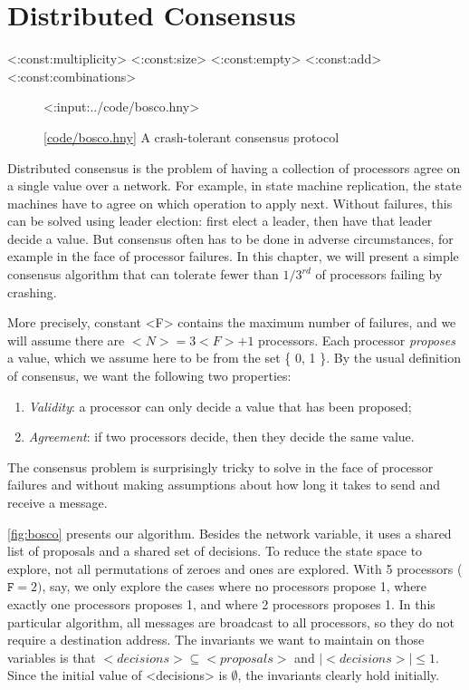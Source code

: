 \documentclass{report}
\newcommand{\harmonylink}[1]{%
[\href{https://harmony.cs.cornell.edu/#1}{\underline{#1}}]%
}
\newenvironment{code}{
\tcolorbox
}{
\endtcolorbox
}
\begin{document}
\chapter{Distributed Consensus}
\label{ch:consensus}

<{:const:multiplicity}>
<{:const:size}>
<{:const:empty}>
<{:const:add}>
<{:const:combinations}>

\begin{figure}
\begin{code}
<{:input:../code/bosco.hny}>
\end{code}
\caption{\harmonylink{code/bosco.hny} A crash-tolerant consensus protocol}
\label{fig:bosco}
\end{figure}

Distributed consensus is the problem of having a collection of processors agree
on a single value over a network.
For example, in state machine replication, the state machines have to agree
on which operation to apply next.
Without failures, this can be solved using leader election: first elect a leader, then have that leader decide a value.
But consensus often has to be done in adverse circumstances,
for example in the face of processor failures.
In this chapter, we will present a simple consensus algorithm that can tolerate
fewer than $1/3^{rd}$ of processors failing by crashing.

More precisely,
constant <{F}> contains the maximum number of failures, and
we will assume there are $<{N}> = 3<{F}> + 1$ processors.
Each processor \emph{proposes} a value, which we assume here to be from the
set \{ 0, 1 \}.
By the usual definition of consensus, we want the following two properties:
\begin{enumerate}
\item \emph{Validity}: a processor can only decide a value that has been proposed;
\item \emph{Agreement}: if two processors decide, then they decide the same value.
\end{enumerate}
The consensus problem is surprisingly tricky to solve in the face of processor
failures and without making assumptions about how long it takes to send
and receive a message.

\autoref{fig:bosco} presents our algorithm.  Besides the network variable, it uses a
shared list of proposals and a shared set of decisions.
To reduce the state space to explore, not all permutations of zeroes and ones are
explored.  With 5 processors ($\mathtt{F} = 2)$, say, we only explore the cases where
no processors propose 1, where exactly one processors proposes 1, and where 2 processors
proposes 1.
In this particular algorithm, all messages are broadcast to all processors, so they do
not require a destination address.
The invariants we want to maintain
on those variables is that $<{decisions}> \subseteq <{proposals}>$
and $|<{decisions}>| \leq 1$.  Since the initial value of <{decisions}> is
$\emptyset$, the invariants clearly hold initially.
\end{document}
